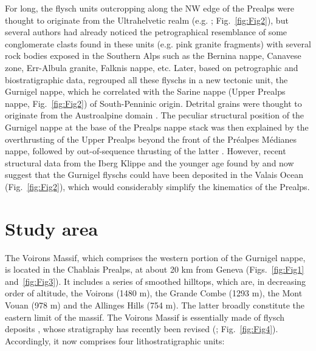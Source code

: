 \documentclass[twoside]{article}
\begin{document}
For long, the flysch units outcropping along the NW edge of the Prealps were thought to originate from the Ultrahelvetic realm (e.g. \citealp{Tercier1928a,Lombard1940a}; Fig.~\ref{fig:Fig2}), but several authors had already noticed the petrographical resemblance of some conglomerate clasts found in these units (e.g. pink granite fragments) with several rock bodies exposed in the Southern Alps \citep{Sarasin1894b,Pilloud1936,Lombard1940a,Cogulu1961} such as the Bernina nappe, Canavese zone, Err-Albula granite, Falknis nappe, etc. Later, based on petrographic and biostratigraphic data, \cite{Caron1976} regrouped all these flyschs in a new tectonic unit, the Gurnigel nappe, which he correlated with the Sarine nappe (Upper Prealps nappe, Fig.~\ref{fig:Fig2}) of South-Penninic origin. Detrital grains were thought to originate from the Austroalpine domain \citep{Winkler1983,Caron1989}. The peculiar structural position of the Gurnigel nappe at the base of the Prealps nappe stack was then explained by the overthrusting of the Upper Prealps beyond the front of the Préalpes Médianes nappe, followed by out-of-sequence thrusting of the latter \citep{Mosar1991,Wissing2002}. However, recent structural data from the Iberg Klippe \citep{Trumpy2006} and the younger age found by \cite{Ujetz1996} and \cite{Ospina-Ostios2013} now suggest that the Gurnigel flyschs could have been deposited in the Valais Ocean (Fig.~\ref{fig:Fig2}), which would considerably simplify the kinematics of the Prealps.\par

\section{Study area}

The Voirons Massif, which comprises the western portion of the Gurnigel nappe, is located in the Chablais Prealps, at about 20 km from Geneva (Figs.~\ref{fig:Fig1} and~\ref{fig:Fig3}). It includes a series of smoothed hilltops, which are, in decreasing order of altitude, the Voirons (1480 m), the Grande Combe (1293 m), the Mont Vouan (978 m) and the Allinges Hills (754 m). The latter broadly constitute the eastern limit of the massif. The Voirons Massif is essentially made of flysch deposits \citep{Lombard1940a,JanduChene1975c,Stuijvenberg1980a}, whose stratigraphy has recently been revised (\citealp{Ragusa2015}; Fig.~\ref{fig:Fig4}). Accordingly, it now comprises four lithostratigraphic units:

\end{document}
